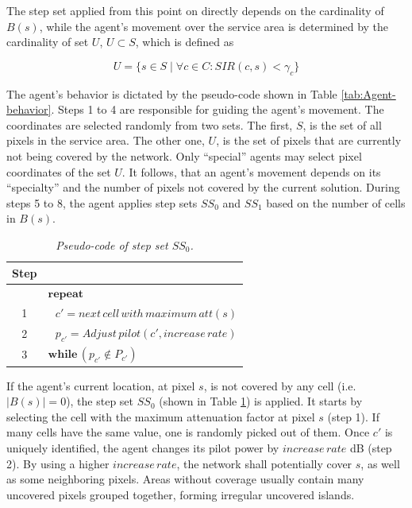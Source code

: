 The step set applied from this point on directly depends on the cardinality
of $B(s)$, while the agent's movement over the service area is determined
by the cardinality of set $U$, $U\subset S$, which is defined as

\begin{equation}
U=\{s\in S\mid\forall c\in C:SIR(c,s)<\gamma_{c}\}
\end{equation}


The agent's behavior is dictated by the pseudo-code shown in Table
\ref{tab:Agent-behavior}. Steps 1 to 4 are responsible for guiding
the agent's movement. The coordinates are selected randomly from two
sets. The first, $S$, is the set of all pixels in the service area.
The other one, $U$, is the set of pixels that are currently not being
covered by the network. Only ``special'' agents may select pixel
coordinates of the set $U$. It follows, that an agent's movement
depends on its ``specialty'' and the number of pixels not covered
by the current solution. During steps 5 to 8, the agent applies step
sets $SS_{0}$ and $SS_{1}$ based on the number of cells in $B(s)$.

\begin{table}
\caption{\textit{Pseudo-code of step set $SS_{0}$.\label{tab:Rule-set-0}}}


\centering

\begin{tabular}{c|l}
\hline 
Step & \tabularnewline[\doublerulesep]
\hline 
 & $\mathbf{repeat}$\tabularnewline
1 & $\,\,\,\, c'=next\, cell\, with\, maximum\, att(s)$\tabularnewline
2 & $\,\,\,\, p_{c'}=Adjust\, pilot(c',increase\, rate)$\tabularnewline
3 & $\mathbf{while}\,(p_{c'}\notin P_{c'})$\tabularnewline
\end{tabular}
\end{table}


If the agent's current location, at pixel $s$, is not covered by
any cell (i.e. $|B(s)|=0$), the step set $SS_{0}$ (shown in Table
\ref{tab:Rule-set-0}) is applied. It starts by selecting the cell
with the maximum attenuation factor at pixel $s$ (step 1). If many
cells have the same value, one is randomly picked out of them. Once
$c'$ is uniquely identified, the agent changes its pilot power by
$increase\, rate$ dB (step 2). By using a higher $increase\, rate$,
the network shall potentially cover $s$, as well as some neighboring
pixels. Areas without coverage usually contain many uncovered pixels
grouped together, forming irregular uncovered islands. 

